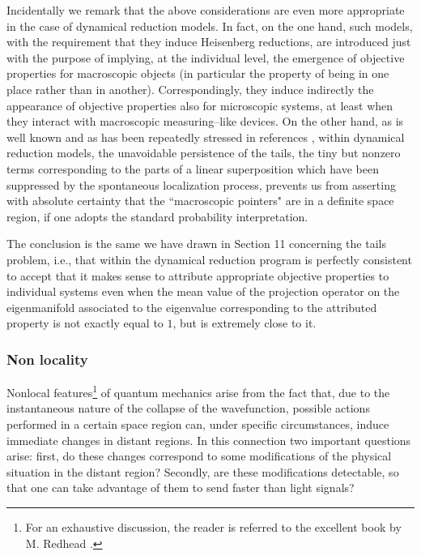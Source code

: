 \documentclass[10pt,a4paper]{article}
\begin{document}
Incidentally we remark that the above considerations are even more
appropriate in the case of dynamical reduction models. In fact, on
the one hand, such models, with the requirement that they induce
Heisenberg reductions, are introduced just with the purpose of
implying, at the individual level, the emergence of objective
properties for macroscopic objects (in particular the property of
being in one place rather than in another). Correspondingly, they
induce indirectly the appearance of objective properties also for
microscopic systems, at least when they interact with macroscopic
measuring--like devices. On the other hand, as is well known and
as has been repeatedly stressed in references
\cite{rel,gprfqm,p62}, within dynamical reduction models, the
unavoidable persistence of the tails, the tiny but nonzero terms
corresponding to the parts of a linear superposition which have
been suppressed by the spontaneous localization process, prevents
us from asserting with absolute certainty that the ``macroscopic
pointers" are in a definite space region, if one adopts the
standard probability interpretation.

The conclusion is the same we have drawn in Section 11 concerning the
tails problem, i.e., that within the dynamical reduction program is
perfectly consistent to accept that it makes
sense to attribute appropriate objective properties to individual
systems  even
when the mean value of the projection operator on the eigenmanifold
associated to the eigenvalue corresponding to the attributed property is
not exactly equal to $1$, but is extremely close to it.

\subsubsection{Non locality} \label{sec1012}

Nonlocal features\footnote{For an exhaustive discussion, the
reader is referred to the excellent book by M. Redhead
\cite{redb}.} of quantum mechanics arise from the fact that, due
to the instantaneous nature of the collapse of the wavefunction,
possible actions performed in a certain space region can, under
specific circumstances, induce immediate changes in distant
regions. In this connection two important questions arise: first,
do these changes correspond to some modifications of the physical
situation in the distant region? Secondly, are these modifications
detectable, so that one can take advantage of them to send faster
than light signals?
\end{document}
